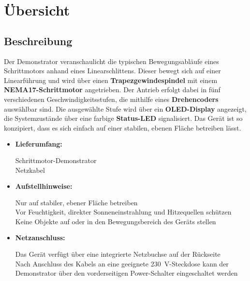 \documentclass[a4paper,12pt]{report}
\begin{document}
	\chapter{Übersicht}
	\section{Beschreibung}
	
	Der Demonstrator veranschaulicht die typischen Bewegungsabläufe eines Schrittmotors anhand eines Linearschlittens. Dieser bewegt sich auf einer Linearführung und wird über einen \textbf{Trapezgewindespindel} mit einem \textbf{NEMA17-Schrittmotor} angetrieben. Der Antrieb erfolgt dabei in fünf verschiedenen Geschwindigkeitsstufen, die mithilfe eines \textbf{Drehencoders} auswählbar sind. Die ausgewählte Stufe wird über ein \textbf{OLED-Display} angezeigt, die Systemzustände über eine farbige \textbf{Status-LED} signalisiert. Das Gerät ist so konzipiert, dass es sich einfach auf einer stabilen, ebenen Fläche betreiben lässt.\\ 
	
	\begin{itemize}[leftmargin=1.5em]
		 
		
		\item\textbf{Lieferumfang:} 
		
		Schrittmotor-Demonstrator\\
		
		Netzkabel\\
		
		\item\textbf{Aufstellhinweise:} 
		
		Nur auf stabiler, ebener Fläche betreiben\\
		Vor Feuchtigkeit, direkter Sonneneinstrahlung und Hitzequellen schützen\\
		
		Keine Objekte auf oder in den Bewegungsbereich des Geräts stellen\\
		
		\item\textbf{Netzanschluss:}  
		
		Das Gerät verfügt über eine integrierte Netzbuchse auf der Rückseite\\
		
		Nach Anschluss des Kabels an eine geeignete 230\ V-Steckdose kann der Demonstrator über den vorderseitigen Power-Schalter eingeschaltet werden\\
		
	\end{itemize}
	\newpage
	
\end{document}
